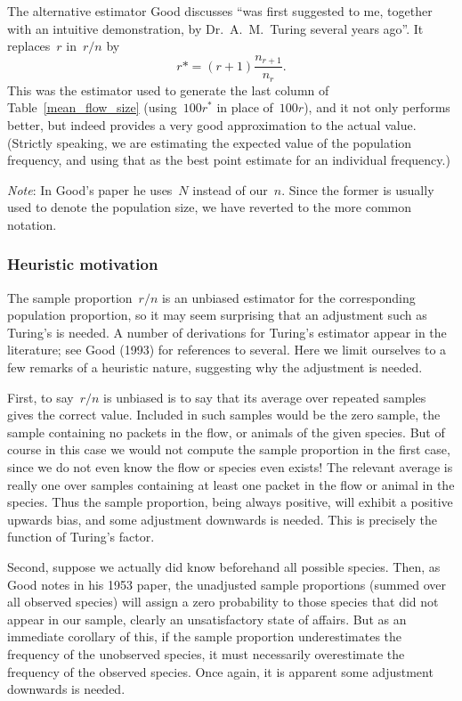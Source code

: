 \documentclass{paper}
\begin{document}
The alternative estimator Good discusses ``was first suggested to me, together
with an intuitive demonstration, by Dr.\ A.\ M.\ Turing several years ago''. It
replaces~$r$ in~$r/n$ by
$$ r* = (r + 1) \frac{n_{r+1}}{n_r}. $$
This was the estimator used to generate the last column of
Table~\ref{mean_flow_size} (using~$100r^*$ in place of~$100r$), and it not only
performs better, but indeed provides a very good approximation to the actual
value. (Strictly speaking, we are estimating the expected value of the
population frequency, and using that as the best point estimate for an
individual frequency.)

\emph{Note}: In Good's paper he uses~$N$ instead of our~$n$. Since the former is
usually used to denote the population size, we have reverted to the more common
notation.

\subsubsection{Heuristic motivation}

The sample proportion~$r/n$ is an unbiased estimator for the corresponding
population proportion, so it may seem surprising that an adjustment such as
Turing's is needed. A number of derivations for Turing's estimator appear in the
literature; see Good (1993) for references to several. Here we limit ourselves
to a few remarks of a heuristic nature, suggesting why the adjustment is needed.

First, to say~$r/n$ is unbiased is to say that its average over repeated samples
gives the correct value. Included in such samples would be the zero sample, the
sample containing no packets in the flow, or animals of the given species. But
of course in this case we would not compute the sample proportion in the first
case, since we do not even know the flow or species even exists! The relevant
average is really one over samples containing at least one packet in the flow or
animal in the species. Thus the sample proportion, being always positive, will
exhibit a positive upwards bias, and some adjustment downwards is needed.  This
is precisely the function of Turing's factor.

Second, suppose we actually did know beforehand all possible species. Then, as
Good notes in his 1953 paper, the unadjusted sample proportions (summed over all
observed species) will assign a zero probability to those species that did not
appear in our sample, clearly an unsatisfactory state of affairs. But as an
immediate corollary of this, if the sample proportion underestimates the
frequency of the unobserved species, it must necessarily overestimate the
frequency of the observed species. Once again, it is apparent some adjustment
downwards is needed.
\end{document}
